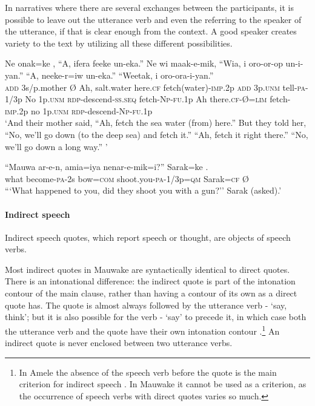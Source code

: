 In narratives where there are several exchanges between the participants, it is possible to leave out the utterance verb and even the  referring to the speaker of the utterance, if that is clear enough from the context. A good speaker creates variety to the text by utilizing all these different possibilities. 

\ea%
\label{ex:8:x1581}
\gll Ne  onak=ke  \textstyleEmphasizedVernacularWords{{\O}},  ``A,  ifera  feeke  un-eka.'' Ne  wi  maak-e-mik,  ``Wia,  i  oro-or-op un-i-yan.''  ``A,  neeke-r=iw  un-eka.''  ``Weetak, i  oro-ora-i-yan.''\\
\textsc{add} 3s/p.mother  {\O}  Ah,  salt.water  here.\textsc{cf} fetch(water)-\textsc{imp}.2p \textsc{add} 3p.\textsc{unm} tell-\textsc{pa}-1/3p No  1p.\textsc{unm} \textsc{rdp}-descend-\textsc{ss}.\textsc{seq} fetch-\textsc{Np}-\textsc{fu}.1p Ah there.\textsc{cf}-{\O}=\textsc{lim} fetch-\textsc{imp}.2p no 1p.\textsc{unm} \textsc{rdp}-descend-\textsc{Np}-\textsc{fu}.1p\\
\glt`And their mother said, ``Ah, fetch the sea water (from) here.'' But they told her, ``No, we'll go down (to the deep sea) and fetch it.'' ``Ah, fetch it right there.'' ``No, we'll go down a long way.'' '
\z


\ea%
\label{ex:8:x1582}
\gll ``Mauwa ar-e-n, amia=iya nenar-e-mik=i?'' Sarak=ke \textstyleEmphasizedVernacularWords{{\O}}.\hspace{-1mm}\\
what become-\textsc{pa}-2s bow=\textsc{com} shoot.you-\textsc{pa}-1/3p=\textsc{qm} Sarak=\textsc{cf} {\O}\\
\glt```What happened to you, did they shoot you with a gun?'' Sarak (asked).'
\z


\paragraph[Indirect speech]{Indirect speech} \label{sec:8.3.2.1.2}

Indirect speech quotes, which report speech or thought, are objects of speech verbs. 

Most indirect quotes in Mauwake are syntactically identical to direct quotes. There is an intonational difference: the indirect quote is part of the intonation contour of the main clause, rather than having a contour of its own as a direct quote has. The quote is almost always followed by the utterance verb - `say, think'; but it is also possible for the verb - `say' to precede it, in which case both the utterance verb and the quote have their own intonation contour .\footnote{In Amele the absence of the speech verb before the quote is the main criterion for indirect speech \citep[14]{Roberts1987}. In Mauwake it cannot be used as a criterion, as the occurrence of speech verbs with direct quotes varies so much.} An indirect quote is never enclosed between two utterance verbs. 

